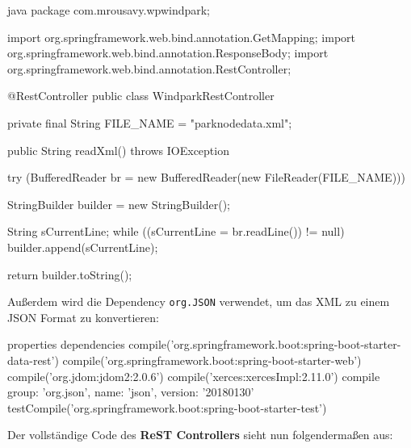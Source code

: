 \begin{code}{java}
    package com.mrousavy.wpwindpark;

    import org.springframework.web.bind.annotation.GetMapping;
    import org.springframework.web.bind.annotation.ResponseBody;
    import org.springframework.web.bind.annotation.RestController;

    @RestController
    public class WindparkRestController {

        private final String FILE_NAME = "parknodedata.xml";

        public String readXml() throws IOException {
            try (BufferedReader br = new BufferedReader(new FileReader(FILE_NAME))) {
                StringBuilder builder = new StringBuilder();

                String sCurrentLine;
                while ((sCurrentLine = br.readLine()) != null) {
                    builder.append(sCurrentLine);
                }

                return builder.toString();
            }
        }
    }
\end{code}

Außerdem wird die Dependency \texttt{org.JSON} verwendet, um das XML zu einem JSON Format zu konvertieren:

\begin{code}{properties}
    dependencies {
        compile('org.springframework.boot:spring-boot-starter-data-rest')
        compile('org.springframework.boot:spring-boot-starter-web')
        compile('org.jdom:jdom2:2.0.6')
        compile('xerces:xercesImpl:2.11.0')
        compile group: 'org.json', name: 'json', version: '20180130'
        testCompile('org.springframework.boot:spring-boot-starter-test')
    }
\end{code}

Der vollständige Code des \textbf{ReST Controllers} sieht nun folgendermaßen aus:

